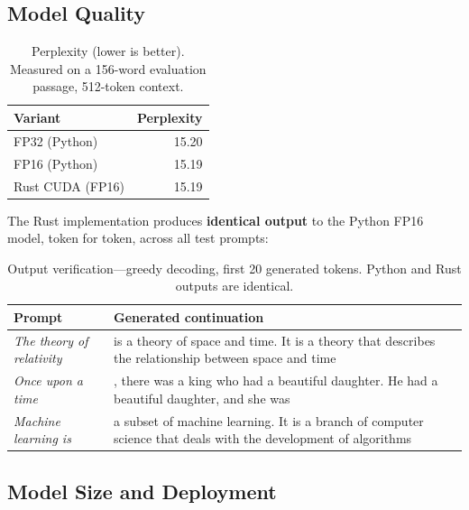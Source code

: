 \documentclass[11pt,a4paper]{article}
\begin{document}
\subsection{Model Quality}

\begin{table}[H]
\centering
\caption{Perplexity (lower is better). Measured on a 156-word evaluation
passage, 512-token context.}
\label{tab:perplexity}
\begin{tabular}{lr}
\toprule
\textbf{Variant} & \textbf{Perplexity} \\
\midrule
FP32 (Python)       & 15.20 \\
FP16 (Python)       & 15.19 \\
Rust CUDA (FP16)    & 15.19 \\
\bottomrule
\end{tabular}
\end{table}

The Rust implementation produces \textbf{identical output} to the Python
FP16 model, token for token, across all test prompts:

\begin{table}[H]
\centering
\small
\caption{Output verification---greedy decoding, first 20 generated tokens.
Python and Rust outputs are identical.}
\begin{tabular}{p{2.8cm}p{10cm}}
\toprule
\textbf{Prompt} & \textbf{Generated continuation} \\
\midrule
\textit{The theory of relativity} & is a theory of space and time. It is a theory that describes the relationship between space and time \\[3pt]
\textit{Once upon a time} & , there was a king who had a beautiful daughter. He had a beautiful daughter, and she was \\[3pt]
\textit{Machine learning is} & a subset of machine learning. It is a branch of computer science that deals with the development of algorithms \\
\bottomrule
\end{tabular}
\end{table}

\subsection{Model Size and Deployment}
\end{document}
